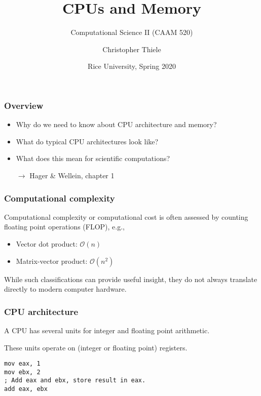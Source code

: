 \documentclass[12pt,t]{beamer}
\newcommand{\conclude}[1]{%
  \begin{itemize}
    \item[$\rightarrow$]#1
  \end{itemize}
}
\begin{document}
  \title{CPUs and Memory}
  \subtitle{Computational Science II (CAAM 520)}
  \author{Christopher Thiele}
  \date{Rice University, Spring 2020}

  \begin{frame}
    \titlepage
  \end{frame}


  \begin{frame}[fragile]
    \frametitle{Overview}

    \begin{itemize}
      \item Why do we need to know about CPU architecture and memory?
      \item What do typical CPU architectures look like?
      \item What does this mean for scientific computations?
    \end{itemize}

    \conclude{Hager \& Wellein, chapter 1}
  \end{frame}

  \begin{frame}[fragile]
    \frametitle{Computational complexity}

    Computational complexity or computational cost is often assessed by counting floating point operations (FLOP), e.g.,
    \begin{itemize}
      \item Vector dot product: $\mathcal O(n)$
      \item Matrix-vector product: $\mathcal O(n^2)$
    \end{itemize}

    While such classifications can provide useful insight, they do not always translate directly to modern computer hardware.
  \end{frame}

  \begin{frame}[fragile]
    \frametitle{CPU architecture}

    A CPU has several units for integer and floating point arithmetic.

    These units operate on (integer or floating point) registers.

    \begin{lstlisting}[frame=single]
mov eax, 1
mov ebx, 2
; Add eax and ebx, store result in eax.
add eax, ebx
    \end{lstlisting}
  \end{frame}
\end{document}
